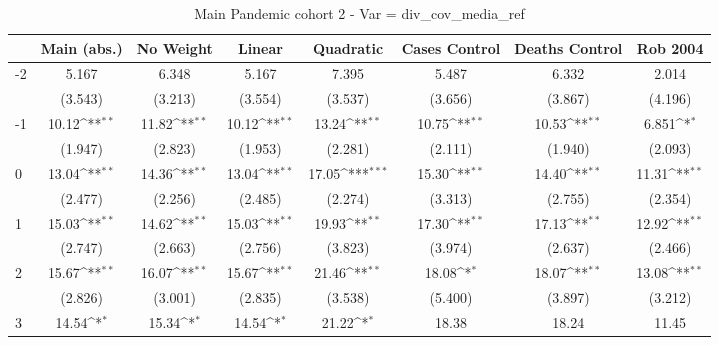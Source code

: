 \documentclass{article}
\begin{document}
{
\def\sym#1{\ifmmode^{#1}\else\(^{#1}\)\fi}
\begin{longtable}{l*{7}{c}}
\caption{Main Pandemic cohort 2 - Var = div\_cov\_media\_ref}\\
\hline\hline\endfirsthead\hline\endhead\hline\endfoot\endlastfoot
                &\multicolumn{1}{c}{Main (abs.)}&\multicolumn{1}{c}{No Weight}&\multicolumn{1}{c}{Linear}&\multicolumn{1}{c}{Quadratic}&\multicolumn{1}{c}{Cases Control}&\multicolumn{1}{c}{Deaths Control}&\multicolumn{1}{c}{Rob 2004}\\
\hline
-2              &    5.167         &    6.348         &    5.167         &    7.395         &    5.487         &    6.332         &    2.014         \\
                &  (3.543)         &  (3.213)         &  (3.554)         &  (3.537)         &  (3.656)         &  (3.867)         &  (4.196)         \\
-1              &    10.12\sym{**} &    11.82\sym{**} &    10.12\sym{**} &    13.24\sym{**} &    10.75\sym{**} &    10.53\sym{**} &    6.851\sym{*}  \\
                &  (1.947)         &  (2.823)         &  (1.953)         &  (2.281)         &  (2.111)         &  (1.940)         &  (2.093)         \\
0               &    13.04\sym{**} &    14.36\sym{**} &    13.04\sym{**} &    17.05\sym{***}&    15.30\sym{**} &    14.40\sym{**} &    11.31\sym{**} \\
                &  (2.477)         &  (2.256)         &  (2.485)         &  (2.274)         &  (3.313)         &  (2.755)         &  (2.354)         \\
1               &    15.03\sym{**} &    14.62\sym{**} &    15.03\sym{**} &    19.93\sym{**} &    17.30\sym{**} &    17.13\sym{**} &    12.92\sym{**} \\
                &  (2.747)         &  (2.663)         &  (2.756)         &  (3.823)         &  (3.974)         &  (2.637)         &  (2.466)         \\
2               &    15.67\sym{**} &    16.07\sym{**} &    15.67\sym{**} &    21.46\sym{**} &    18.08\sym{*}  &    18.07\sym{**} &    13.08\sym{**} \\
                &  (2.826)         &  (3.001)         &  (2.835)         &  (3.538)         &  (5.400)         &  (3.897)         &  (3.212)         \\
3               &    14.54\sym{*}  &    15.34\sym{*}  &    14.54\sym{*}  &    21.22\sym{*}  &    18.38         &    18.24         &    11.45         \\

\end{longtable}}
\end{document}
